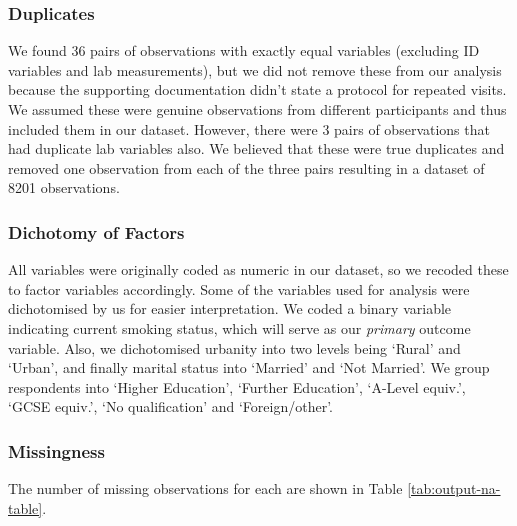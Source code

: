 \documentclass[
  11pt,
  twocolumn]{article}
\begin{document}
\subsubsection{Duplicates}\label{duplicates}

We found 36 pairs of observations with exactly equal variables
(excluding ID variables and lab measurements), but we did not remove
these from our analysis because the supporting documentation didn't
state a protocol for repeated visits. We assumed these were genuine
observations from different participants and thus included them in our
dataset. However, there were 3 pairs of observations that had duplicate
lab variables also. We believed that these were true duplicates and
removed one observation from each of the three pairs resulting in a
dataset of 8201 observations.

\subsubsection{Dichotomy of Factors}\label{dichotomy-of-factors}

All variables were originally coded as numeric in our dataset, so we
recoded these to factor variables accordingly. Some of the variables
used for analysis were dichotomised by us for easier interpretation. We
coded a binary variable indicating current smoking status, which will
serve as our \emph{primary} outcome variable. Also, we dichotomised
urbanity into two levels being `Rural' and `Urban', and finally marital
status into `Married' and `Not Married'. We group respondents into
`Higher Education', `Further Education', `A-Level equiv.', `GCSE
equiv.', `No qualification' and `Foreign/other'.

\subsubsection{Missingness}\label{missingness}

The number of missing observations for each are shown in Table
\ref{tab:output-na-table}.
\end{document}
